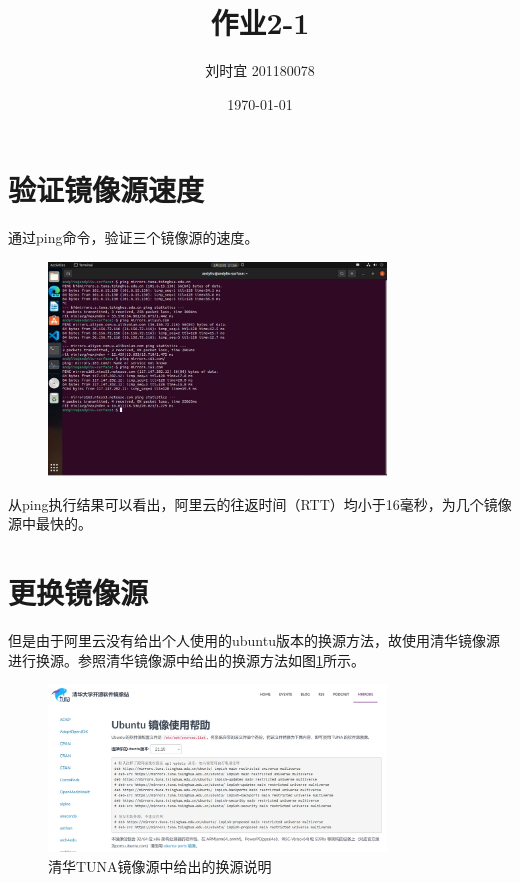 \documentclass[UTF8]{ctexart}
\title{\textbf{作业2-1}}
\author{刘时宜 201180078}
\date{\today}
\begin{document}
    \maketitle
    \tableofcontents
    \section{验证镜像源速度}
    通过ping命令，验证三个镜像源的速度。
    \begin{figure}[H]
        \centering
        \includegraphics[width=0.8\textwidth]{ping.jpg}
    \end{figure}
    从ping执行结果可以看出，阿里云的往返时间（RTT）均小于16毫秒，为几个镜像源中最快的。
    

    \section{更换镜像源}
    但是由于阿里云没有给出个人使用的ubuntu版本的换源方法，故使用清华镜像源进行换源。参照清华镜像源中给出的换源方法如图\ref{thu mirror}所示。
    \begin{figure}[H]
        \centering
        \includegraphics[width=0.8\textwidth]{thu mirror.jpg}
        \caption{清华TUNA镜像源中给出的换源说明}
        \label{thu mirror}
    \end{figure}
\end{document}
